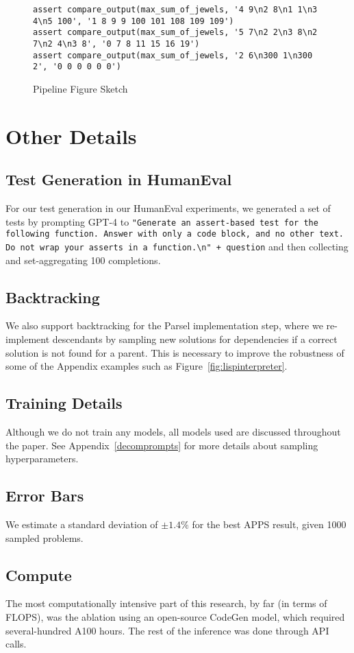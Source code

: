 \begin{figure*}
\begin{lstlisting}
assert compare_output(max_sum_of_jewels, '4 9\n2 8\n1 1\n3 4\n5 100', '1 8 9 9 100 101 108 109 109')
assert compare_output(max_sum_of_jewels, '5 7\n2 2\n3 8\n2 7\n2 4\n3 8', '0 7 8 11 15 16 19')
assert compare_output(max_sum_of_jewels, '2 6\n300 1\n300 2', '0 0 0 0 0 0')
\end{lstlisting}

\caption{Pipeline Figure Sketch}
\end{figure*}

\clearpage
\newpage

\section{Other Details}
\subsection{Test Generation in HumanEval}
For our test generation in our HumanEval experiments, we generated a set of tests by prompting GPT-4 to \lstinline{"Generate an assert-based test for the following function. Answer with only a code block, and no other text. Do not wrap your asserts in a function.\n" + question} and then collecting and set-aggregating 100 completions.

\subsection{Backtracking}
We also support backtracking for the Parsel implementation step, where we re-implement descendants by sampling new solutions for dependencies if a correct solution is not found for a parent. This is necessary to improve the robustness of some of the Appendix examples such as Figure~\ref{fig:lispinterpreter}.

\subsection{Training Details}
Although we do not train any models, all models used are discussed throughout the paper. See Appendix~\ref{decomprompts} for more details about sampling hyperparameters.
\subsection{Error Bars}
We estimate a standard deviation of $\pm 1.4\%$ for the best APPS result, given 1000 sampled problems. 
\subsection{Compute}
The most computationally intensive part of this research, by far (in terms of FLOPS), was the ablation using an open-source CodeGen model, which required several-hundred A100 hours. The rest of the inference was done through API calls.

